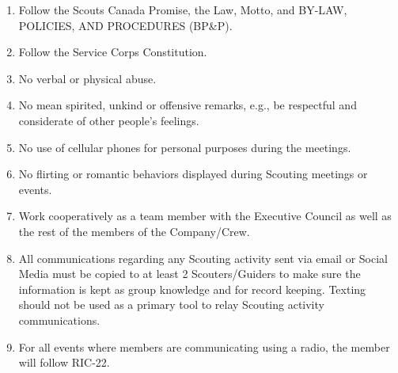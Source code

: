 \documentclass{Service_Corps_Document}
\begin{document}
    \def \Title {Code of Conduct}
    \def \Company {Service Corps}
    \def \versionNumber {3.0}
    \stdFooter
    \begin{titlepage}
        \stdTitlePage
    \end{titlepage}
    \begin{enumerate}
        \item Follow the Scouts Canada Promise, the Law, Motto, and BY-LAW, POLICIES, AND PROCEDURES (BP\&P).
        \item Follow the Service Corps Constitution.
        \item No verbal or physical abuse.
        \item No mean spirited, unkind or offensive remarks, e.g., be respectful and considerate of other people's feelings.
        \item No use of cellular phones for personal purposes during the meetings.
        \item No flirting or romantic behaviors displayed during Scouting meetings or events.
        \item Work cooperatively as a team member with the Executive Council as well as the rest of the members of the Company/Crew.
        \item All communications regarding any Scouting activity sent via email or Social Media must be copied to at least 2 Scouters/Guiders to make sure the information is kept as group knowledge and for record keeping.
        Texting should not be used as a primary tool to relay Scouting activity communications.
        \item For all events where members are communicating using a radio, the member will follow RIC-22.
    \end{enumerate}
\end{document}
